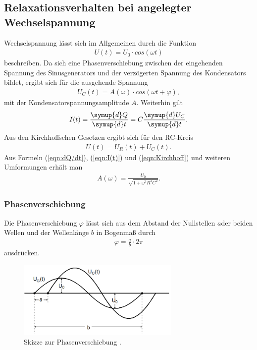 \subsection{Relaxationsverhalten bei angelegter Wechselspannung}
\label{sec:RelaxationsverhaltenbeiangelegterWechselspannung}

Wechselspannung lässt sich im Allgemeinen durch die Funktion
\begin{align*}
    U(t)=U_0 \cdot cos(\omega t)
\end{align*}
beschreiben. Da sich eine Phasenverschiebung zwischen der eingehenden Spannung des Sinusgenerators und der verzögerten Spannung des Kondensators bildet,
ergibt sich für die ausgehende Spannung
\begin{align*}
    U_{C}(t)=A(\omega)\cdot cos(\omega t +\varphi),
\end{align*}
mit der Kondensatorspannungsamplitude $A$. Weiterhin gilt
\begin{align}
    \label{eqn:I(t)}
    I(t)=\frac{\symup{d}Q}{\symup{d}t}=C\frac{\symup{d}U_C}{\symup{d}t}.
\end{align}
Aus den Kirchhoffschen Gesetzen ergibt sich für den RC-Kreis
\begin{align}
    \label{eqn:Kirchhoff}
    U(t)=U_{R}(t)+U_{C}(t).
\end{align}
Aus Formeln (\ref{eqn:dQ/dt}), (\ref{eqn:I(t)}) und (\ref{eqn:Kirchhoff}) und weiteren Umformungen erhält man
\begin{align}
    \label{eqn:Amplitude}
    A(\omega)=\frac{U_0}{\sqrt{1+\omega^2 R^2 C^2}}.
\end{align}

\subsubsection{Phasenverschiebung}
\label{sec:PhasenverschiebungTheorie}
Die Phasenverschiebung $\varphi$ lässt sich aus dem Abstand der Nullstellen $a$der beiden Wellen 
und der Wellenlänge $b$ in Bogenmaß durch
\begin{align}
    \label{eqn:phi}
    \varphi = \frac{a}{b} \cdot 2\pi
\end{align}
ausdrücken.
\begin{figure}
    \centering
    \includegraphics[width=0.7\textwidth]{Phasenverschiebung.png}
    \caption{Skizze zur Phasenverschiebung \cite{sample}.}
    \label{fig:Phasenverschiebung}
\end{figure}

